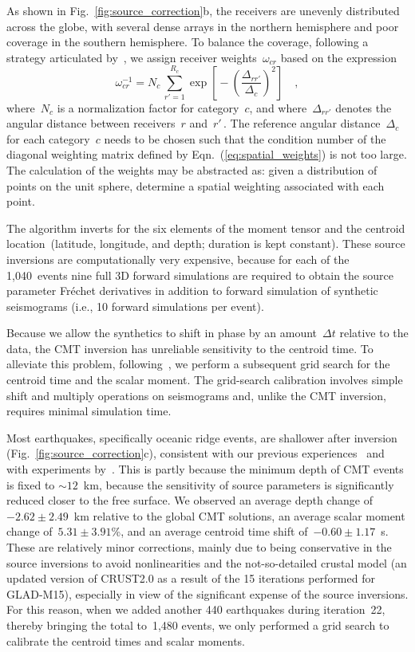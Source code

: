 \documentclass[extra,mreferee]{gji}
\begin{document}
As shown in Fig.~\ref{fig:source_correction}b,
the receivers are unevenly distributed across the globe,
with several dense arrays in the northern hemisphere and poor coverage in the southern hemisphere.
To balance the coverage,
following a strategy articulated by~\cite{Ruanetal2018},
we assign receiver weights~$\omega_{cr}$ based on the expression
\begin{equation}
\omega_{cr}^{-1} = N_c\,\sum_{r'=1}^{R_c} \exp\left[\mbox{}-\left(\frac{\Delta_{rr'}}{\Delta_c}\right)^2\right]
\quad ,
\label{eq:spatial_weights}
\end{equation}
where~$N_c$ is a normalization factor for category~$c$,
and where~$\Delta_{rr'}$ denotes the angular distance between receivers~$r$ and~$r'$\,.
The reference angular distance~$\Delta_c$ for each category~$c$ needs to be chosen such that the condition 
number of the diagonal weighting matrix defined by Eqn.~(\ref{eq:spatial_weights}) is not too large.
The calculation of the weights may be abstracted as: given a distribution of
points on the unit sphere, determine a spatial weighting associated with each point.

The algorithm inverts for the six elements of the moment tensor
and the centroid location~(latitude, longitude, and depth; duration is kept constant).
These source inversions are computationally very expensive,
because for each of the 1,040~events nine full 3D forward simulations are required to obtain the source parameter Fr\'echet derivatives in addition to forward simulation of synthetic seismograms (i.e., 10 forward simulations per event).

Because we allow the synthetics to shift in phase by an amount~$\Delta t$ relative to the data,
the CMT inversion has unreliable sensitivity to the centroid time.
To alleviate this problem,
following~\cite{zhu2012structure},
we perform a subsequent grid search for the centroid time and the scalar moment.
The grid-search calibration involves simple shift and multiply operations on seismograms
and, unlike the CMT inversion, requires minimal simulation time.

Most earthquakes, specifically oceanic ridge events, are shallower after inversion
(Fig.~\ref{fig:source_correction}c),
consistent with our previous experiences~\citep[e.g.,][]{zhu2015seismic,chen2015multiparameter,bozdaug2016global} and with experiments by~\cite{hjorleifsdottir2010effects}. This is partly because the minimum depth of CMT events is fixed to $\sim12$~km, because the sensitivity of source parameters is significantly reduced closer to the free surface. 
We observed an average depth change of~$-2.62\pm2.49$~km relative to the global CMT solutions,
an average scalar moment change of~$5.31\pm3.91$\%,
and an average centroid time shift of~$-0.60\pm1.17$~s.
These are relatively minor corrections, mainly due to being conservative in the source inversions to avoid nonlinearities and the not-so-detailed crustal model (an updated version of CRUST2.0 as a result of the 15 iterations performed for GLAD-M15), especially in view of the significant expense of the source inversions.
For this reason, when we added another 440 earthquakes during iteration~22,
thereby bringing the total to~1,480 events,
we only performed a grid search to calibrate the centroid times and scalar moments.
\end{document}
